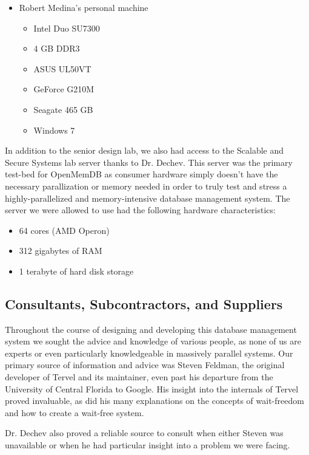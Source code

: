 \documentclass[letterpaper, 11pt]{article}
\begin{document}
\begin{itemize}
 \item Robert Medina's personal machine
 \begin{itemize}
  \item{ Intel Duo SU7300}
  \item{ 4 GB DDR3}
  \item{ ASUS UL50VT}
  \item{ GeForce G210M}
  \item{ Seagate 465 GB}
  \item{ Windows 7}
 \end{itemize}

\end{itemize}
\par\vspace{\baselineskip}
In addition to the senior design lab, we also had access to the Scalable and Secure Systems lab server
thanks to Dr. Dechev. This server was the primary test-bed for OpenMemDB as consumer hardware simply
doesn't have the necessary parallization or memory needed in order to truly test and stress a
highly-parallelized and memory-intensive database management system. The server we were allowed to
use had the following hardware characteristics:
\begin{itemize}
 \item 64 cores (AMD Operon)
 \item 312 gigabytes of RAM
 \item 1 terabyte of hard disk storage
\end{itemize}

\newpage

\subsection{Consultants, Subcontractors, and Suppliers}
Throughout the course of designing and developing this database management system we sought the advice
and knowledge of various people, as none of us are experts or even particularly knowledgeable in
massively parallel systems. Our primary source of information and advice was Steven Feldman, the
original developer of Tervel and its maintainer, even past his departure from the University of Central
Florida to Google. His insight into the internals of Tervel proved invaluable, as did his many
explanations on the concepts of wait-freedom and how to create a wait-free system.
\par\vspace{\baselineskip}
Dr. Dechev also proved a reliable source to consult when either Steven was unavailable or when he
had particular insight into a problem we were facing.
\newpage
\end{document}
